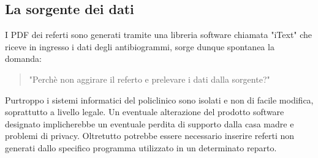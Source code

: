 \subsection{La sorgente dei dati}
I PDF dei referti sono generati tramite una libreria software chiamata "iText" che riceve in ingresso i dati degli antibiogrammi, sorge dunque spontanea la domanda: 
\begin{quotation}
  "Perchè non aggirare il referto e prelevare i dati dalla sorgente?"
\end{quotation}
Purtroppo i sistemi informatici del policlinico sono isolati e non di facile modifica, soprattutto a livello legale. Un eventuale alterazione del prodotto software designato implicherebbe un eventuale perdita di supporto dalla casa madre e problemi di privacy. Oltretutto potrebbe essere necessario inserire referti non generati dallo specifico programma utilizzato in un determinato reparto.




